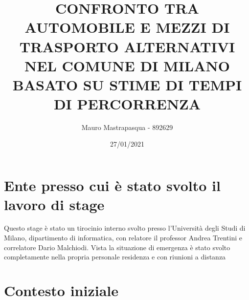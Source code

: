 \documentclass{article}
\title{{\Large\textbf{CONFRONTO TRA AUTOMOBILE E MEZZI DI TRASPORTO ALTERNATIVI NEL COMUNE DI MILANO BASATO SU STIME DI TEMPI DI PERCORRENZA}}}
\author{\LARGE{Mauro Mastrapasqua - 892629}}
\date{\Large{27/01/2021}}
\begin{document}
	\maketitle
	\vspace{1cm}
	
\section{Ente presso cui è stato svolto il lavoro di stage}

\large{
Questo stage è stato un tirocinio interno svolto presso l'Università degli Studi di Milano, dipartimento di informatica, con relatore il professor Andrea Trentini e correlatore Dario Malchiodi. Vista la situazione di emergenza è stato svolto completamente nella propria personale residenza e con riunioni a distanza
}

\section{Contesto iniziale}

\large{

}













	
\end{document}
